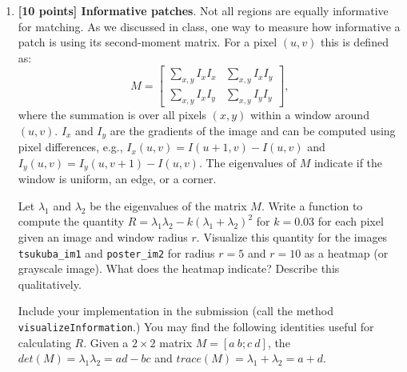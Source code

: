 \documentclass[10pt,letterpaper]{article}
\newcommand{\cmd}[1] {{\color{blue}\texttt{#1}}}
\begin{document}
\begin{enumerate}
\item \textbf{[10 points] Informative patches}. 
  Not all regions are equally informative
  for matching. 
  As we discussed in class, one way to measure how informative a patch
  is using its second-moment matrix. For a pixel $(u,v)$ this is
  defined as:
\begin{equation}
M = \begin{bmatrix}
             \sum_{x,y} I_{x}I_x            &  \sum_{x,y}I_{x}I_{y}\\
            \sum_{x,y}I_{x}I_{y}  &  \sum_{x,y}I_{y}I_y
        \end{bmatrix}, 
\end{equation}
  where the summation is over all pixels $(x,y)$ within a window around
  $(u,v)$. 
  $I_x$ and $I_y$ are the gradients of the image and can be computed
  using pixel differences, e.g., $I_x(u,v) = I(u+1, v) -
  I(u,v)$ and $I_y(u,v) = I_y(u,v+1) - I(u,v)$.
  The eigenvalues of $M$ indicate if the window is uniform, an
  edge, or a corner.

  Let $\lambda_1$ and $\lambda_2$ be the eigenvalues of the matrix
  $M$. 
  Write a function to compute the quantity $R = \lambda_1\lambda_2 - k(\lambda_1 +
  \lambda_2)^2$ for $k=0.03$ for each pixel given an image and window radius $r$. 
  Visualize this quantity for the images \cmd{tsukuba\_im1} and
  \cmd{poster\_im2} for radius $r = 5$ and $r=10$ as a heatmap (or
  grayscale image).
  What does the heatmap indicate? Describe this qualitatively.

  Include your implementation in the submission (call the method \cmd{visualizeInformation}.)
  You may find the following identities useful for calculating
  $R$. Given a $2\times 2$ matrix $M = [a~b; c~d]$, the $det(M) = \lambda_1
  \lambda_2 = ad-bc$ and $trace(M) = \lambda_1 + \lambda_2 = a + d$.


    
        

\end{enumerate}
\end{document}
